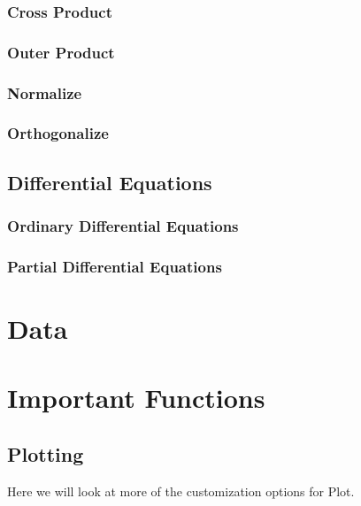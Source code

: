 \documentclass[11pt,letterpaper,twoside,titlepage]{book}
\begin{document}
			\section{Cross Product}
			
			\section{Outer Product}
			
			\section{Normalize}
			
			\section{Orthogonalize}
		
	
		\chapter{Differential Equations}
		
			\section{Ordinary Differential Equations}
			
			\section{Partial Differential Equations}
	
	\part{Data}
	
		
	
	\part{Important Functions}
	
		\chapter{Plotting}
		
			Here we will look at more of the customization options for Plot.
			
\end{document}
